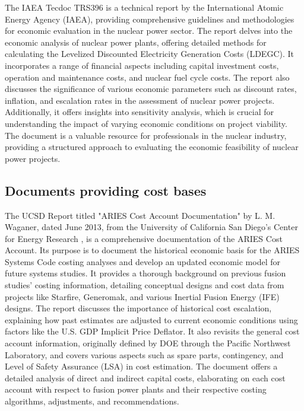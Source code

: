 The IAEA Tecdoc TRS396 \cite{Meyer2000} is a technical report by the International Atomic Energy Agency (IAEA), providing comprehensive guidelines and methodologies for economic evaluation in the nuclear power sector. The report delves into the economic analysis of nuclear power plants, offering detailed methods for calculating the Levelized Discounted Electricity Generation Costs (LDEGC). It incorporates a range of financial aspects including capital investment costs, operation and maintenance costs, and nuclear fuel cycle costs. The report also discusses the significance of various economic parameters such as discount rates, inflation, and escalation rates in the assessment of nuclear power projects. Additionally, it offers insights into sensitivity analysis, which is crucial for understanding the impact of varying economic conditions on project viability. The document is a valuable resource for professionals in the nuclear industry, providing a structured approach to evaluating the economic feasibility of nuclear power projects.

\subsection{Documents providing cost bases}

The UCSD Report titled "ARIES Cost Account Documentation" by L. M. Waganer, dated June 2013, from the University of California San Diego's Center for Energy Research \cite{Waganer2013}, is a comprehensive documentation of the ARIES Cost Account. Its purpose is to document the historical economic basis for the ARIES Systems Code costing analyses and develop an updated economic model for future systems studies. It provides a thorough background on previous fusion studies' costing information, detailing conceptual designs and cost data from projects like Starfire, Generomak, and various Inertial Fusion Energy (IFE) designs. The report discusses the importance of historical cost escalation, explaining how past estimates are adjusted to current economic conditions using factors like the U.S. GDP Implicit Price Deflator. It also revisits the general cost account information, originally defined by DOE through the Pacific Northwest Laboratory, and covers various aspects such as spare parts, contingency, and Level of Safety Assurance (LSA) in cost estimation. The document offers a detailed analysis of direct and indirect capital costs, elaborating on each cost account with respect to fusion power plants and their respective costing algorithms, adjustments, and recommendations.\\

